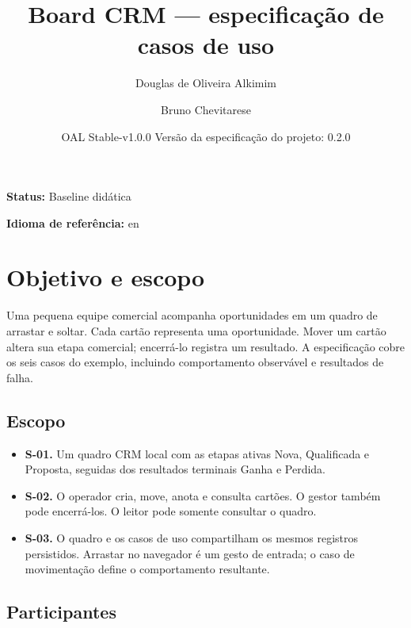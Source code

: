 \documentclass[10pt,a4paper]{article}
\begin{document}
\title{Board CRM --- especificação de casos de uso}

\author{Douglas de Oliveira Alkimim \and Bruno Chevitarese}

\date{OAL Stable-v1.0.0 \quad Versão da especificação do projeto: 0.2.0}

\maketitle

\textbf{Status:} Baseline didática

\textbf{Idioma de referência:} en

\section{Objetivo e escopo}

Uma pequena equipe comercial acompanha oportunidades em um quadro de arrastar e soltar. Cada cartão representa uma oportunidade. Mover um cartão altera sua etapa comercial; encerrá-lo registra um resultado. A especificação cobre os seis casos do exemplo, incluindo comportamento observável e resultados de falha.

\subsection{Escopo}

\begin{itemize}

\item \textbf{S-01.} Um quadro CRM local com as etapas ativas Nova, Qualificada e Proposta, seguidas dos resultados terminais Ganha e Perdida.

\item \textbf{S-02.} O operador cria, move, anota e consulta cartões. O gestor também pode encerrá-los. O leitor pode somente consultar o quadro.

\item \textbf{S-03.} O quadro e os casos de uso compartilham os mesmos registros persistidos. Arrastar no navegador é um gesto de entrada; o caso de movimentação define o comportamento resultante.

\end{itemize}

\subsection{Participantes}
\end{document}
